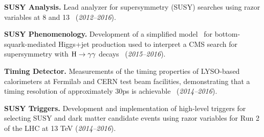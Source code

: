 \documentclass[11pt]{res}
\newcommand{\MR}{\ensuremath{M_\mathrm{R}}\xspace}
\newcommand{\Rtwo}{\ensuremath{\mathrm{R}^2}\xspace}
\begin{document}
\begin{resume}
\textbf{SUSY Analysis.} Lead analyzer for supersymmetry (SUSY) searches using
  razor variables at 8 and 13\TeV~\cite{Khachatryan:2016epu,Duarte:2016wnw,razor8TeV} (\textit{2012--2016}).

\textbf{SUSY Phenomenology.} Development of a simplified model~\cite{Duarte:2017bbq}
  for bottom-squark-mediated Higgs+jet production used to interpret a
  CMS search for supersymmetry with $\mathrm{H}\to\gamma\gamma$
  decays~\cite{Sirunyan:2017eie} (\textit{2015--2016}).

\textbf{Timing Detector.} Measurements of the timing properties of
  LYSO-based calorimeters at Fermilab and CERN test beam facilities, demonstrating that a timing
  resolution of approximately 30\unit{ps} is achievable~\cite{Bornheim:2017gql,testbeam,IEEE,NIMA,Bornheim_2015,NIMA2}
  (\textit{2014--2016}).


\textbf{SUSY Triggers.} Development and implementation of high-level
triggers for selecting SUSY and dark matter candidate events using
razor variables for Run 2 of the LHC at 13 TeV  (\textit{2014--2016}).


\end{resume}
\end{document}
